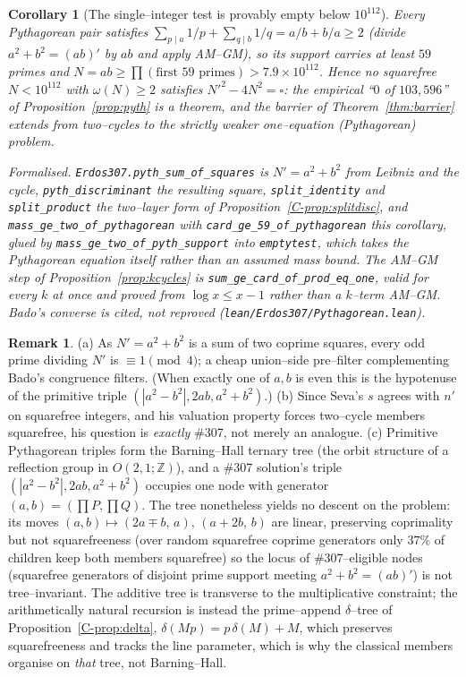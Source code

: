 \documentclass[11pt]{article}
\newtheorem{corollary}[theorem]{Corollary}
\theoremstyle{definition}
\newtheorem{remark}[theorem]{Remark}
\begin{document}
\begin{corollary}[The single--integer test is provably empty below $10^{112}$]\label{cor:emptytest}
Every Pythagorean pair satisfies $\sum_{p\mid a}1/p+\sum_{q\mid b}1/q=a/b+b/a\ge2$ (divide
$a^2+b^2=(ab)'$ by $ab$ and apply AM--GM), so its support carries at least $59$ primes and
$N=ab\ge\prod(\text{first }59\text{ primes})>7.9\times10^{112}$. Hence no squarefree $N<10^{112}$ with
$\omega(N)\ge2$ satisfies $N'^2-4N^2=\square$: the empirical ``$0$ of $103{,}596$'' of
Proposition~\ref{prop:pyth} is a theorem, and the barrier of Theorem~\ref{thm:barrier} extends from
two--cycles to the strictly weaker one--equation (Pythagorean) problem.

\textup{Formalised.} \texttt{Erdos307.pyth\_sum\_of\_squares} is $N'=a^2+b^2$ from Leibniz and the
cycle, \texttt{pyth\_discriminant} the resulting square, \texttt{split\_identity} and
\texttt{split\_product} the two--layer form of Proposition~\ref{C-prop:splitdisc}, and
\texttt{mass\_ge\_two\_of\_pythagorean} with \texttt{card\_ge\_59\_of\_pythagorean} this corollary,
glued by \texttt{mass\_ge\_two\_of\_pyth\_support} into \texttt{emptytest}, which takes the
Pythagorean equation itself rather than an assumed mass bound.
The AM--GM step of Proposition~\ref{prop:kcycles} is \texttt{sum\_ge\_card\_of\_prod\_eq\_one}, valid
for every $k$ at once and proved from $\log x\le x-1$ rather than a $k$--term AM--GM. Bado's converse
is cited, not reproved \textup{(\texttt{lean/Erdos307/Pythagorean.lean})}.
\end{corollary}

\begin{remark}
(a) As $N'=a^2+b^2$ is a sum of two coprime squares, every odd prime dividing $N'$ is
$\equiv1\pmod4$; a cheap union--side pre--filter complementing Bado's congruence filters. (When
exactly one of $a,b$ is even this is the hypotenuse of the primitive triple $(|a^2-b^2|,2ab,a^2+b^2)$.)
(b) Since Seva's $s$ agrees with $n'$ on squarefree integers, and his valuation property forces
two--cycle members squarefree, his question is \emph{exactly} \#307, not merely an analogue.
(c) Primitive Pythagorean triples form the Barning--Hall ternary tree (the orbit structure of a
reflection group in $O(2,1;\mathbb{Z})$), and a \#307 solution's triple $(|a^2-b^2|,2ab,a^2+b^2)$
occupies one node with generator $(a,b)=(\prod P,\prod Q)$. The tree nonetheless yields no descent on
the problem: its moves $(a,b)\mapsto(2a\mp b,\,a),\,(a+2b,\,b)$ are linear, preserving coprimality but
not squarefreeness (over random squarefree coprime generators only $37\%$ of children keep both
members squarefree) so the locus of \#307--eligible nodes (squarefree generators of disjoint prime
support meeting $a^2+b^2=(ab)'$) is not tree--invariant. The additive tree is transverse to the
multiplicative constraint; the arithmetically natural recursion is instead the prime--append
$\delta$--tree of Proposition~\ref{C-prop:delta}, $\delta(Mp)=p\,\delta(M)+M$, which preserves
squarefreeness and tracks the line parameter, which is why the classical members organise on
\emph{that} tree, not Barning--Hall.
\end{remark}
\end{document}
